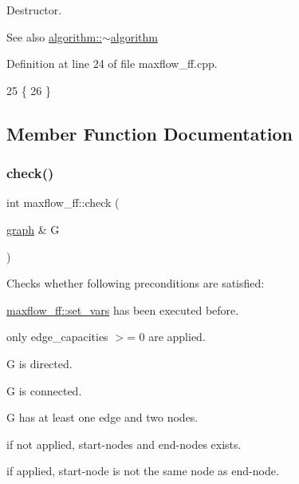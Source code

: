 Destructor.

\begin{DoxySeeAlso}{See also}
\mbox{\hyperlink{classalgorithm_adca9b1e7fa3afd914519a9dbb44e9fd5}{algorithm\+::$\sim$algorithm}} 
\end{DoxySeeAlso}


Definition at line 24 of file maxflow\+\_\+ff.\+cpp.


\begin{DoxyCode}
25 \{
26 \}
\end{DoxyCode}


\subsection{Member Function Documentation}
\mbox{\label{classmaxflow__ff_a4d0deee7d70bac4c9dad942341d87e37}} 
\subsubsection{\texorpdfstring{check()}{check()}}
{\footnotesize\ttfamily int maxflow\+\_\+ff\+::check (\begin{DoxyParamCaption}\item[{\mbox{\hyperlink{classgraph}{graph}} \&}]{G }\end{DoxyParamCaption})\hspace{0.3cm}{\ttfamily [virtual]}}

Checks whether following preconditions are satisfied\+: 
\begin{DoxyItemize}
\item \mbox{\hyperlink{classmaxflow__ff_ad2485a4c093dbcfa045d1e6e5d78f533}{maxflow\+\_\+ff\+::set\+\_\+vars}} has been executed before. 
\item only edge\+\_\+capacities $>$= 0 are applied. 
\item {\ttfamily G} is directed. 
\item {\ttfamily G} is connected. 
\item {\ttfamily G} has at least one edge and two nodes. 
\item if not applied, start-\/nodes and end-\/nodes exists. 
\item if applied, start-\/node is not the same node as end-\/node. 
\end{DoxyItemize}


